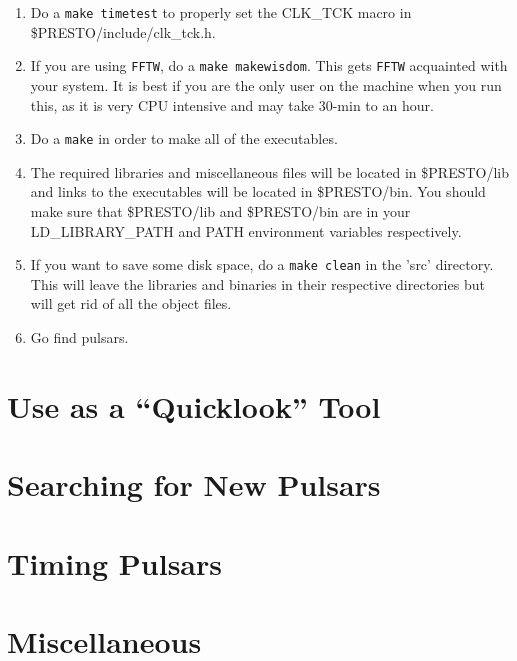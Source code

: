 \documentclass[11pt]{article}
\begin{document}
\begin{enumerate}
\item Do a {\tt make timetest} to properly set the CLK\_TCK macro in
  \$PRESTO/include/clk\_tck.h.

\item If you are using {\tt FFTW}, do a {\tt make makewisdom}.  This
  gets {\tt FFTW} acquainted with your system.  It is best if you are
  the only user on the machine when you run this, as it is very CPU
  intensive and may take 30-min to an hour.
  
\item Do a {\tt make} in order to make all of the executables.
  
\item The required libraries and miscellaneous files will be located
  in \$PRESTO/lib and links to the executables will be located in
  \$PRESTO/bin.  You should make sure that \$PRESTO/lib and
  \$PRESTO/bin are in your LD\_LIBRARY\_PATH and PATH environment
  variables respectively.
  
\item If you want to save some disk space, do a {\tt make clean} in
  the 'src' directory.  This will leave the libraries and binaries in
  their respective directories but will get rid of all the object
  files.
  
\item Go find pulsars.

\end{enumerate}

\section{Use as a ``Quicklook'' Tool}

\section{Searching for New Pulsars}

\section{Timing Pulsars}

\section{Miscellaneous}
\end{document}
